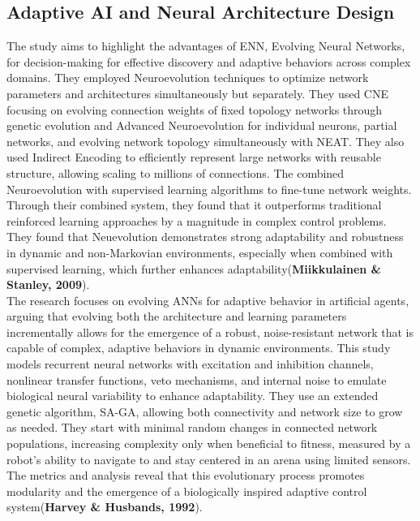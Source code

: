 \subsection{Adaptive AI and Neural Architecture Design}
The study aims to highlight the advantages of ENN, Evolving Neural Networks, for decision-making for effective discovery and adaptive behaviors across complex domains. They employed Neuroevolution techniques to optimize network parameters and architectures simultaneously but separately. They used CNE focusing on evolving connection weights of fixed topology networks through genetic evolution and Advanced Neuroevolution for individual neurons, partial networks, and evolving network topology simultaneously with NEAT. They also used Indirect Encoding to efficiently represent large networks with reusable structure, allowing scaling to millions of connections. The combined Neuroevolution with supervised learning algorithms to fine-tune network weights. Through their combined system, they found that it outperforms traditional reinforced learning approaches by a magnitude in complex control problems. They found that Neuevolution demonstrates strong adaptability and robustness in dynamic and non-Markovian environments, especially when combined with supervised learning, which further enhances adaptability(\textbf{Miikkulainen \& Stanley, 2009})\cite{Miikkulainen}.\\

The research focuses on evolving ANNs for adaptive behavior in artificial agents, arguing that evolving both the architecture and learning parameters incrementally allows for the emergence of a robust, noise-resistant network that is capable of complex, adaptive behaviors in dynamic environments. This study models recurrent neural networks with excitation and inhibition channels, nonlinear transfer functions, veto mechanisms, and internal noise to emulate biological neural variability to enhance adaptability. They use an extended genetic algorithm, SA-GA, allowing both connectivity and network size to grow as needed. They start with minimal random changes in connected network populations, increasing complexity only when beneficial to fitness, measured by a robot’s ability to navigate to and stay centered in an arena using limited sensors. The metrics and analysis reveal that this evolutionary process promotes modularity and the emergence of a biologically inspired adaptive control system(\textbf{Harvey \& Husbands, 1992})\cite{Harvey}.\\

